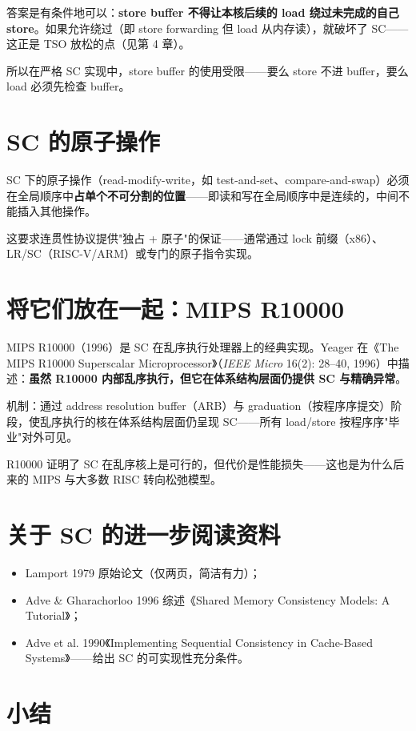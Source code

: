 答案是有条件地可以：\textbf{store buffer 不得让本核后续的 load 绕过未完成的自己 store}。如果允许绕过（即 store forwarding 但 load 从内存读），就破坏了 SC——这正是 TSO 放松的点（见第 4 章）。

所以在严格 SC 实现中，store buffer 的使用受限——要么 store 不进 buffer，要么 load 必须先检查 buffer。

\section{SC 的原子操作}

SC 下的原子操作（read-modify-write，如 test-and-set、compare-and-swap）必须在全局顺序中\textbf{占单个不可分割的位置}——即读和写在全局顺序中是连续的，中间不能插入其他操作。

这要求连贯性协议提供"独占 + 原子"的保证——通常通过 lock 前缀（x86）、LR/SC（RISC-V/ARM）或专门的原子指令实现。

\section{将它们放在一起：MIPS R10000}

MIPS R10000（1996）是 SC 在乱序执行处理器上的经典实现。Yeager 在《The MIPS R10000 Superscalar Microprocessor》（\emph{IEEE Micro} 16(2): 28–40, 1996）中描述：\textbf{虽然 R10000 内部乱序执行，但它在体系结构层面仍提供 SC 与精确异常}。

机制：通过 address resolution buffer（ARB）与 graduation（按程序序提交）阶段，使乱序执行的核在体系结构层面仍呈现 SC——所有 load/store 按程序序"毕业"对外可见。

R10000 证明了 SC 在乱序核上是可行的，但代价是性能损失——这也是为什么后来的 MIPS 与大多数 RISC 转向松弛模型。

\section{关于 SC 的进一步阅读资料}

\begin{itemize}
\item Lamport 1979 原始论文（仅两页，简洁有力）；
\item Adve \& Gharachorloo 1996 综述《Shared Memory Consistency Models: A Tutorial》；
\item Adve et al. 1990《Implementing Sequential Consistency in Cache-Based Systems》——给出 SC 的可实现性充分条件。
\end{itemize}


\section{小结}

